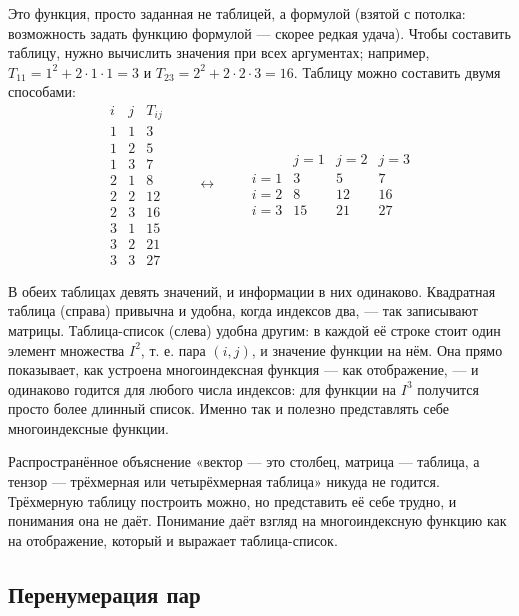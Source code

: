 \documentclass[11pt,a4paper]{article}
\begin{document}
Это функция, просто заданная не таблицей, а формулой (взятой с потолка: возможность задать функцию формулой — скорее редкая удача). Чтобы составить таблицу, нужно вычислить значения при всех аргументах; например, $T_{11} = 1^2 + 2 \cdot 1 \cdot 1 = 3$ и $T_{23} = 2^2 + 2 \cdot 2 \cdot 3 = 16$. Таблицу можно составить двумя способами:
\[
\begin{array}{cc|c}
i & j & T_{ij} \\ \hline
1 & 1 & 3 \\
1 & 2 & 5 \\
1 & 3 & 7 \\
2 & 1 & 8 \\
2 & 2 & 12 \\
2 & 3 & 16 \\
3 & 1 & 15 \\
3 & 2 & 21 \\
3 & 3 & 27
\end{array}
\qquad \longleftrightarrow \qquad
\begin{array}{c|ccc}
 & j=1 & j=2 & j=3 \\ \hline
i=1 & 3 & 5 & 7 \\
i=2 & 8 & 12 & 16 \\
i=3 & 15 & 21 & 27
\end{array}
\]

В обеих таблицах девять значений, и информации в них одинаково. Квадратная таблица (справа) привычна и удобна, когда индексов два, — так записывают матрицы. Таблица-список (слева) удобна другим: в каждой её строке стоит один элемент множества $I^2$, т. е. пара $(i, j)$, и значение функции на нём. Она прямо показывает, как устроена многоиндексная функция — как отображение, — и одинаково годится для любого числа индексов: для функции на $I^3$ получится просто более длинный список. Именно так и полезно представлять себе многоиндексные функции.


Распространённое объяснение «вектор — это столбец, матрица — таблица, а тензор — трёхмерная или четырёхмерная таблица» никуда не годится. Трёхмерную таблицу построить можно, но представить её себе трудно, и понимания она не даёт. Понимание даёт взгляд на многоиндексную функцию как на отображение, который и выражает таблица-список.

\subsection{Перенумерация пар}
\end{document}
